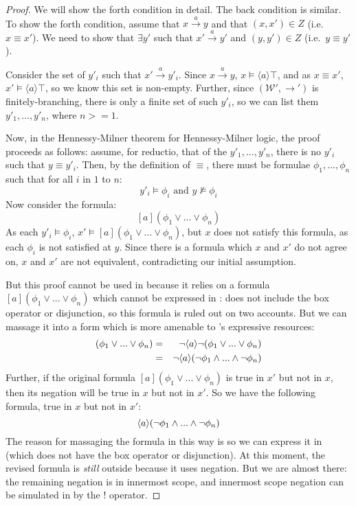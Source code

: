 \begin{proof}
We will show the forth condition in detail. The back condition is 
similar.  To show the forth condition, assume that $x \xrightarrow{a}
y$ and that $(x,x') \in Z$ (i.e.~$x \equiv x'$).  We need to show that
$\exists y'$ such that $x' \xrightarrow{a} y'$ and $(y,y') \in Z$
(i.e.~$y \equiv y'$).

Consider the set of $y'_i$ such that $x' \xrightarrow{a} y'_i$. Since
$x \xrightarrow{a} y$, $x \models \langle a \rangle \top$, and as $x
\equiv x'$, $x' \models \langle a \rangle \top$, so we know this set
is non-empty.  Further, since $(\mathcal{W}', \rightarrow')$ is
finitely-branching, there is only a finite set of such $y'_i$, so we
can list them $y'_1, ..., y'_n$, where $n >= 1$.

Now, in the Hennessy-Milner theorem for Hennessy-Milner logic, the proof proceeds as
follows: assume, for reductio, that of the $y'_1, ..., y'_n$, there is
no $y'_i$ such that $y \equiv y'_i$.  Then, by the definition of
$\equiv$, there must be formulae $\phi_1, ..., \phi_n$ such that for
all $i$ in $1$ to $n$:
\[
y'_i \models \phi_i \mbox{ and } y \nvDash \phi_i
\]
Now consider the formula:
\[
[a] (\phi_1 \lor ... \lor \phi_n)
\]
As each $y'_i \models \phi_i$, $x' \models [a] (\phi_1 \lor ... \lor \phi_n)$, but $x$ does not satisfy this formula, as each $\phi_i$ is not satisfied at $y$.
Since there is a formula which $x$ and $x'$ do not agree on, $x$ and $x'$ are not equivalent, contradicting our initial assumption.

But this proof cannot be used in \cathoristic{} because it relies on a formula $[a] (\phi_1 \lor ... \lor \phi_n)$ which cannot be expressed in \cathoristic{}: 
\Cathoristic{} does not include the box operator or disjunction, so this formula is ruled out on two accounts.
But we can massage it into a form which is more amenable to \cathoristic{}'s expressive resources:
\begin{eqnarray*}
[a] (\phi_1 \lor ... \lor \phi_n) & = & \neg \langle a \rangle \neg (\phi_1 \lor ... \lor \phi_n)  \\
	& = & \neg \langle a \rangle (\neg \phi_1\AND ... \AND \neg \phi_n) 
\end{eqnarray*}
Further, if the original formula $[a] (\phi_1 \lor ... \lor \phi_n)$ is true in $x'$ but not in $x$, then its negation will be true in $x$ but not in $x'$. 
So we have the following formula, true in $x$ but not in $x'$:
\[
 \langle a \rangle (\neg \phi_1\land ... \land \neg \phi_n)
 \]
The reason for massaging the formula in this way is so we can express it in \cathoristic{} (which does not have the box operator or disjunction).
At this moment, the revised formula is \emph{still} outside \cathoristic{} because it uses negation. 
But we are almost there: the remaining negation is in innermost scope, and innermost scope negation can be simulated in \cathoristic{} by the $!$ operator. 


\end{proof}
